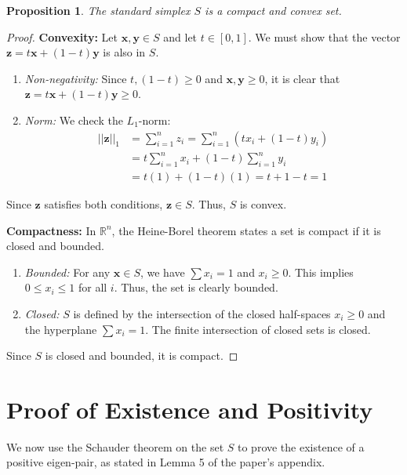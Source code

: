 \documentclass[12pt,a4paper]{report}
\theoremstyle{plain}
\newtheorem{proposition}[theorem]{Proposition}
\theoremstyle{definition}
\theoremstyle{remark}
\begin{document}
\begin{proposition}
The standard simplex $S$ is a compact and convex set.
\end{proposition}
\begin{proof}
\textbf{Convexity:} Let $\bm{x}, \bm{y} \in S$ and let $t \in [0, 1]$. We must show that the vector $\bm{z} = t\bm{x} + (1-t)\bm{y}$ is also in $S$.
\begin{enumerate}
    \item \textit{Non-negativity:} Since $t, (1-t) \ge 0$ and $\bm{x}, \bm{y} \ge 0$, it is clear that $\bm{z} = t\bm{x} + (1-t)\bm{y} \ge 0$.
    \item \textit{Norm:} We check the $L_1$-norm:
    \begin{align*}
        ||\bm{z}||_1 &= \sum_{i=1}^n z_i = \sum_{i=1}^n (t x_i + (1-t)y_i) \\
        &= t \sum_{i=1}^n x_i + (1-t) \sum_{i=1}^n y_i \\
        &= t(1) + (1-t)(1) = t + 1 - t = 1
    \end{align*}
\end{enumerate}
Since $\bm{z}$ satisfies both conditions, $\bm{z} \in S$. Thus, $S$ is convex.

\textbf{Compactness:} In $\mathbb{R}^n$, the Heine-Borel theorem states a set is compact if it is closed and bounded.
\begin{enumerate}
    \item \textit{Bounded:} For any $\bm{x} \in S$, we have $\sum x_i = 1$ and $x_i \ge 0$. This implies $0 \le x_i \le 1$ for all $i$. Thus, the set is clearly bounded.
    \item \textit{Closed:} $S$ is defined by the intersection of the closed half-spaces $x_i \ge 0$ and the hyperplane $\sum x_i = 1$. The finite intersection of closed sets is closed.
\end{enumerate}
Since $S$ is closed and bounded, it is compact.
\end{proof}

\section{Proof of Existence and Positivity}
We now use the Schauder theorem on the set $S$ to prove the existence of a positive eigen-pair, as stated in Lemma 5 of the paper's appendix.
\end{document}
